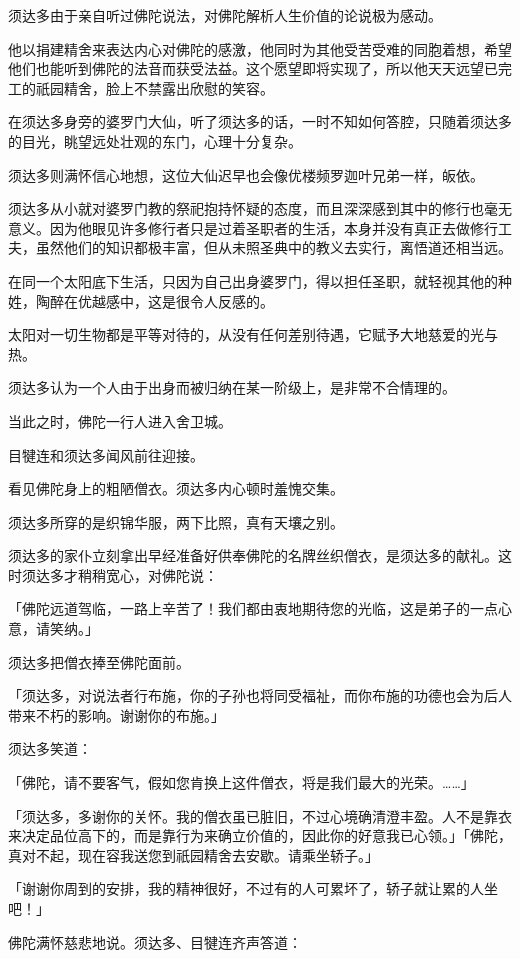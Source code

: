 \documentclass[twoside,openany]{book}
\begin{document}
须达多由于亲自听过佛陀说法，对佛陀解析人生价值的论说极为感动。

他以捐建精舍来表达内心对佛陀的感激，他同时为其他受苦受难的同胞着想，希望他们也能听到佛陀的法音而获受法益。这个愿望即将实现了，所以他天天远望已完工的祇园精舍，脸上不禁露出欣慰的笑容。

在须达多身旁的婆罗门大仙，听了须达多的话，一时不知如何答腔，只随着须达多的目光，眺望远处壮观的东门，心理十分复杂。

须达多则满怀信心地想，这位大仙迟早也会像优楼频罗迦叶兄弟一样，皈依。

须达多从小就对婆罗门教的祭祀抱持怀疑的态度，而且深深感到其中的修行也毫无意义。因为他眼见许多修行者只是过着圣职者的生活，本身并没有真正去做修行工夫，虽然他们的知识都极丰富，但从未照圣典中的教义去实行，离悟道还相当远。

在同一个太阳底下生活，只因为自己出身婆罗门，得以担任圣职，就轻视其他的种姓，陶醉在优越感中，这是很令人反感的。

太阳对一切生物都是平等对待的，从没有任何差别待遇，它赋予大地慈爱的光与热。

须达多认为一个人由于出身而被归纳在某一阶级上，是非常不合情理的。

当此之时，佛陀一行人进入舍卫城。

目犍连和须达多闻风前往迎接。

看见佛陀身上的粗陋僧衣。须达多内心顿时羞愧交集。

须达多所穿的是织锦华服，两下比照，真有天壤之别。

须达多的家仆立刻拿出早经准备好供奉佛陀的名牌丝织僧衣，是须达多的献礼。这时须达多才稍稍宽心，对佛陀说：

「佛陀远道驾临，一路上辛苦了！我们都由衷地期待您的光临，这是弟子的一点心意，请笑纳。」

须达多把僧衣捧至佛陀面前。

「须达多，对说法者行布施，你的子孙也将同受福祉，而你布施的功德也会为后人带来不朽的影响。谢谢你的布施。」

须达多笑道：

「佛陀，请不要客气，假如您肯换上这件僧衣，将是我们最大的光荣。……」

「须达多，多谢你的关怀。我的僧衣虽已脏旧，不过心境确清澄丰盈。人不是靠衣来决定品位高下的，而是靠行为来确立价值的，因此你的好意我已心领。」「佛陀，真对不起，现在容我送您到祇园精舍去安歇。请乘坐轿子。」

「谢谢你周到的安排，我的精神很好，不过有的人可累坏了，轿子就让累的人坐吧！」

佛陀满怀慈悲地说。须达多、目犍连齐声答道：
\end{document}
